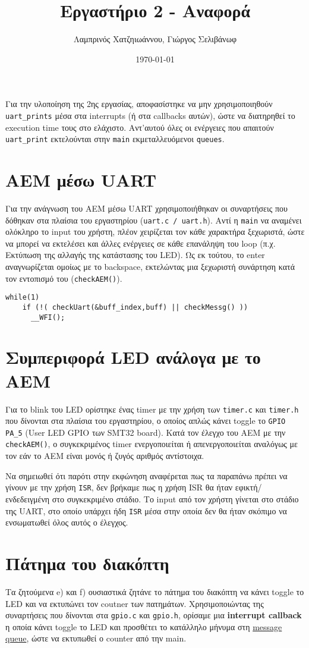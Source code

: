 \documentclass[11pt]{article}
\author{Λαμπρινός Χατζηιωάννου, Γιώργος Σελιβάνωφ}
\date{\today}
\title{Εργαστήριο 2 - Αναφορά}
\begin{document}
\maketitle
\tableofcontents

Για την υλοποίηση της 2ης εργασίας, αποφασίστηκε να μην
χρησιμοποιηθούν \texttt{uart\_prints} μέσα στα interrupts (ή στα callbacks
αυτών), ώστε να διατηρηθεί το execution time τους στο ελάχιστο.
Αντ’αυτού όλες οι ενέργειες που απαιτούν \texttt{uart\_print} εκτελούνται στην
\texttt{main} εκμεταλλευόμενοι \texttt{queues}.
\section{ΑΕΜ μέσω UART}
\label{sec:orgcf79778}
Για την ανάγνωση του ΑΕΜ μέσω UART χρησιμοποιήθηκαν οι συναρτήσεις που
δόθηκαν στα πλαίσια του εργαστηρίου (\texttt{uart.c / uart.h}). Αντί η \texttt{main} να
αναμένει ολόκληρο το input του χρήστη, πλέον χειρίζεται τον κάθε
χαρακτήρα ξεχωριστά, ώστε να μπορεί να εκτελέσει και άλλες ενέργειες
σε κάθε επανάληψη του loop (π.χ. Εκτύπωση της αλλαγής της κατάστασης
του LED). Ως εκ τούτου, το enter αναγνωρίζεται ομοίως με το backspace,
εκτελώντας μια ξεχωριστή συνάρτηση κατά τον εντοπισμό του
(\texttt{checkAEM()}).

\begin{verbatim}
while(1) 
    if (!( checkUart(&buff_index,buff) || checkMessg() ))
      __WFI();
\end{verbatim}
\section{Συμπεριφορά LED ανάλογα με το AEM}
\label{sec:orgd417858}
Για το blink του LED ορίστηκε ένας timer με την χρήση των \texttt{timer.c} και
\texttt{timer.h} που δίνονται στα πλαίσια του εργαστηρίου, ο οποίος απλώς κάνει
toggle το \texttt{GPIO PA\_5} (User LED GPIO των SMT32 board). Κατά τον έλεγχο
του ΑΕΜ με την \texttt{checkAEM()}, ο συγκεκριμένος timer ενεργοποιείται ή
απενεργοποιείται αναλόγως με τον εάν το ΑΕΜ είναι μονός ή ζυγός
αριθμός αντίστοιχα.

Να σημειωθεί ότι παρότι στην εκφώνηση αναφέρεται πως τα παραπάνω
πρέπει να γίνουν με την χρήση \texttt{ISR}, δεν βρήκαμε πως η χρήση ISR θα ήταν
εφικτή/ενδεδειγμένη στο συγκεκριμένο στάδιο. Το input από τον χρήστη
γίνεται στο στάδιο της UART, στο οποίο υπάρχει ήδη \texttt{ISR} μέσα στην οποία
δεν θα ήταν σκόπιμο να ενσωματωθεί όλος αυτός ο έλεγχος.
\section{Πάτημα του διακόπτη}
\label{sec:org31a7316}
Τα ζητούμενα e) και f) ουσιαστικά ζητάνε το πάτημα του διακόπτη να
κάνει toggle το LED και να εκτυπώνει τον coutner των πατημάτων.
Χρησιμοποιώντας της συναρτήσεις που δίνονται στα \texttt{gpio.c} και \texttt{gpio.h},
ορίσαμε μια \textbf{interrupt callback} η οποία κάνει toggle το LED και
προσθέτει το κατάλληλο μήνυμα στη \hyperref[sec:org3847045]{message queue}, ώστε να εκτυπωθεί ο
counter από την main.
\end{document}

